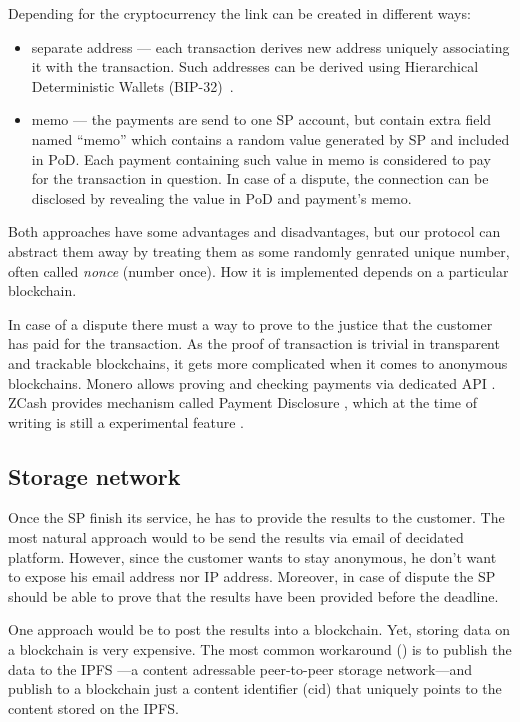 \documentclass{ieeeaccess}
\begin{document}
Depending for the cryptocurrency the link can be created in different
ways:

\begin{itemize}

\item
  separate address — each transaction derives new address uniquely
  associating it with the transaction. Such addresses can be derived
  using Hierarchical Deterministic Wallets (BIP-32)~\cite{bipsbip089}.
\item
  memo — the payments are send to one SP account, but contain extra
  field named ``memo'' which contains a random value generated by SP and
  included in $\mathrm{PoD}$. Each payment containing such value in memo is
  considered to pay for the transaction in question. In case of a dispute,
  the connection can be disclosed by revealing the value in $\mathrm{PoD}$ and payment's memo.
\end{itemize}

Both approaches have some advantages and disadvantages, but our protocol can abstract them away by treating them as some randomly genrated unique number, often called \textit{nonce} (number once). How it is implemented depends on a particular blockchain.

In case of a dispute there must a way to prove to the justice that the customer has paid for the transaction. As the proof of transaction is trivial in transparent and trackable blockchains, it gets more complicated when it comes to anonymous blockchains. Monero allows proving and checking payments via dedicated API \cite{Howtopro46}. ZCash provides mechanism called Payment Disclosure \cite{AnIntrod25}, which at the time of writing is still a experimental feature
\cite{paymentd11}.

\subsection{Storage network}\label{storage-network}
Once the SP finish its service, he has to provide the results to the customer. The most natural approach would to be send the results via email of decidated platform. However, since the customer wants to stay anonymous, he don't want to expose his email address nor IP address. Moreover, in case of dispute the SP should be able to prove that the results have been provided before the deadline.

One approach would be to post the results into a blockchain. Yet, storing data on a blockchain is very expensive. The most common workaround (\cite{shahid2020blockchain, wang2019auditable, chen2017improved, Usageide95}) is to publish the data to the IPFS \cite{benet2014ipfs}—a content adressable peer-to-peer storage network—and publish to a blockchain just a content identifier (cid) that uniquely points to the content stored on the IPFS.
\end{document}
